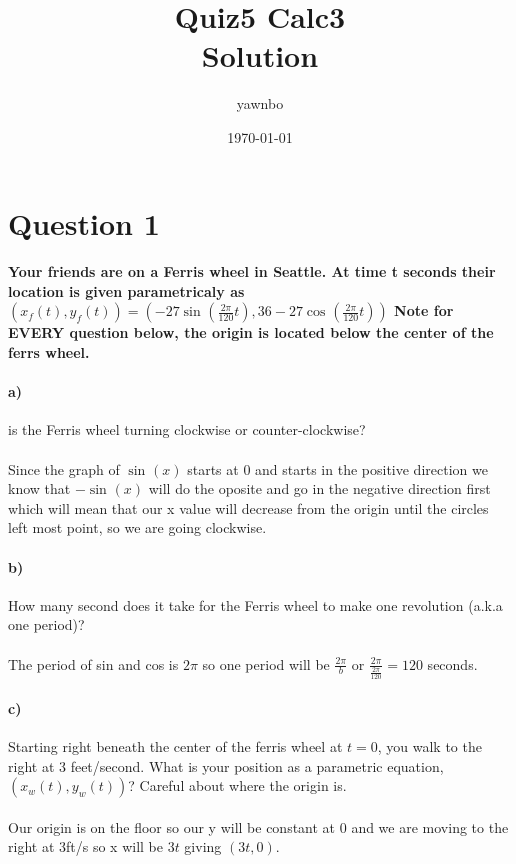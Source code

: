 \documentclass{report}
\title{\Huge{Quiz5 Calc3}\\ Solution }
\author{\huge{yawnbo}}
\date{\today}
\begin{document}
\maketitle
\newpage%

\pagebreak

\section*{Question 1}%
\label{sec:Question 1}
\paragraph{Your friends are on a Ferris wheel in Seattle. At time t seconds their location is given parametricaly as $ \left( x_f\left( t \right) ,y_f\left( t \right)  \right) =\left( -27\sin^{  } \left( \frac{ 2\pi }{ 120 } t \right) , 36-27\cos^{  } \left( \frac{ 2\pi }{ 120 } t \right)  \right)  $ Note for EVERY question below, the origin is located below the center of the ferrs wheel.}
\paragraph{a)} is the Ferris wheel turning clockwise or counter-clockwise? \\ \\
Since the graph of $ \sin^{  } \left( x \right)  $ starts at 0 and starts in the positive direction we know that $ -\sin^{  } \left( x \right)  $ will do the oposite and go in the negative direction first which will mean that our x value will decrease from the origin until the circles left most point, so we are going clockwise.
\paragraph{b)} How many second does it take for the Ferris wheel to make one revolution (a.k.a one period)? \\ \\
The period of sin and cos is $ 2\pi  $ so one period will be $ \frac{ 2\pi }{ b }  $ or $ \frac{ 2\pi }{ \frac{ 2\pi }{ 120 }  } =120 $ seconds. 
\paragraph{c)}Starting right beneath the center of the ferris wheel at $ t=0 $, you walk to the right at 3 feet/second. What is your position as a parametric equation, $ \left( x_w\left( t \right) ,y_w\left( t \right)  \right)  $? Careful about where the origin is. \\ \\ 
Our origin is on the floor so our y will be constant at 0 and we are moving to the right at 3ft/s so x will be $ 3t $ giving $ \left( 3t,0 \right)  $. 
\end{document}
